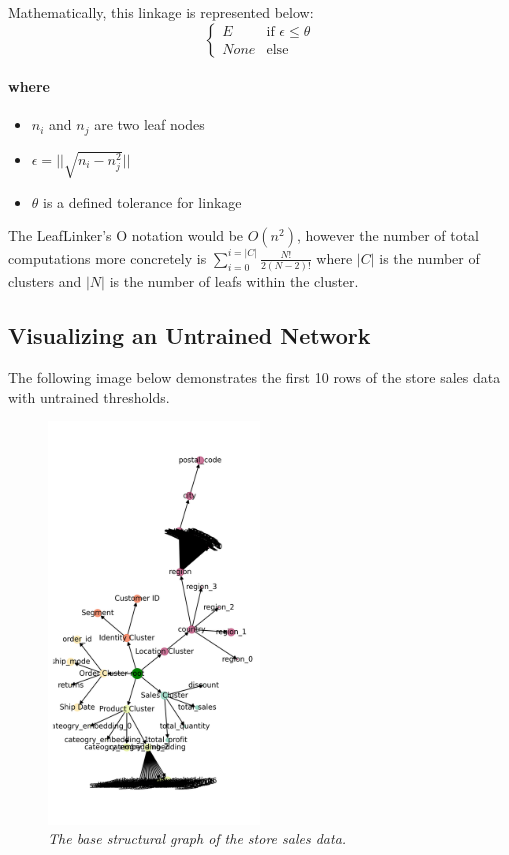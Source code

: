 Mathematically, this linkage is represented below:
\[
\begin{cases}
     E & \text{if } \epsilon \le \theta\\
     None & \text{else}
\end{cases}
\]


\paragraph{where}
\begin{itemize}
  \item{$n_{i}$ and $n_{j}$ are two leaf nodes }
  \item{$\epsilon = || \sqrt{n_{i}-n_{j}^{2}} ||$}
  \item{$\theta$ is a defined tolerance for linkage}
\end{itemize}

The LeafLinker's O notation would be $O(n^{2})$, however the number of total computations more concretely is $\sum_{i=0}^{i=|C|}\frac{N!}{2(N-2)!}$ where $|C|$ is the number of clusters and $|N|$ is the number of leafs within the cluster.

\subsection{Visualizing an Untrained Network}

The following image below demonstrates the first 10 rows of the store sales data with untrained thresholds.

\begin{figure}[H]
	\centering
        \includegraphics[width=0.5\textwidth]{images/base_model.png}
	\caption{\textit{The base structural graph of the store sales data.}}
	\label{fig:fig5}
\end{figure}

